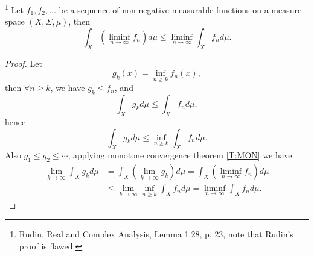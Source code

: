 \begin{lemma}  \label{L:FAT}
\footnote{Rudin, Real and Complex Analysis, Lemma 1.28, p. 23, note that
  Rudin's proof is flawed.}
Let $f_1,f_2,\dots$ be a sequence of non-negative measurable functions on a 
measure space $(X,\Sigma,\mu)$, then
\begin{equation}
  \int_X \left( \liminf_{n\to\infty} f_n \right) d\mu
    \le \liminf_{n\to\infty} \int_X f_n d\mu.
\end{equation}
\end{lemma}
\begin{proof}
Let
\[
  g_k(x)=\inf_{n\ge k} f_n(x),
\]
then $\forall n\ge k$, we have $g_k\le f_n$, and
\[
  \int_X g_k d\mu \le \int_X f_n d\mu,
\]
hence
\[
  \int_X g_k d\mu \le \inf_{n\ge k} \int_X f_n d\mu.
\]
Also $g_1\le g_2\le \cdots$, applying monotone convergence theorem \ref{T:MON}
we have
\begin{align*}
  \lim_{k\to\infty} \int_X g_k d\mu
   &= \int_X (\lim_{k\to\infty} g_k) d\mu
   = \int_X \left( \liminf_{n\to\infty} f_n \right) d\mu   \\
   &\le \lim_{k\to\infty} \inf_{n\ge k} \int_X f_n d\mu
   = \liminf_{n\to\infty} \int_X f_n d\mu.
\end{align*}
\end{proof}

